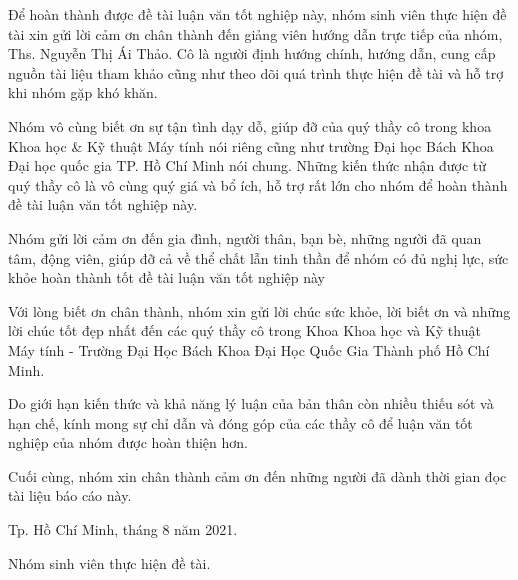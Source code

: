 Để hoàn thành được đề tài luận văn tốt nghiệp này, nhóm sinh viên thực hiện đề tài xin gửi lời cảm ơn chân thành đến giảng viên hướng dẫn trực tiếp của nhóm, Ths. Nguyễn Thị Ái Thảo. Cô là người định hướng chính, hướng dẫn, cung cấp nguồn tài liệu tham khảo cũng như theo dõi quá trình thực hiện đề tài và hỗ trợ khi nhóm gặp khó khăn.\par

Nhóm vô cùng biết ơn sự tận tình dạy dỗ, giúp đỡ của quý thầy cô trong khoa Khoa học \& Kỹ thuật Máy tính nói riêng cũng như trường Đại học Bách Khoa  Đại học quốc gia TP. Hồ Chí Minh nói chung. Những kiến thức nhận được từ quý thầy cô là vô cùng quý giá và bổ ích, hỗ trợ rất lớn cho nhóm để hoàn thành đề tài luận văn tốt nghiệp này.\par

Nhóm gửi lời cảm ơn đến gia đình, người thân, bạn bè, những người đã quan tâm, động viên, giúp đỡ cả về thể chất lẫn tinh thần để nhóm có đủ nghị lực, sức khỏe hoàn thành tốt đề tài luận văn tốt nghiệp này\par

Với lòng biết ơn chân thành, nhóm xin gửi lời chúc sức khỏe, lời biết ơn
và những lời chúc tốt đẹp nhất đến các quý thầy cô trong Khoa Khoa học và Kỹ thuật Máy tính - Trường Đại Học Bách Khoa Đại Học Quốc Gia Thành phố Hồ Chí Minh.\par

Do giới hạn kiến thức và khả năng lý luận của bản thân còn nhiều thiếu sót và hạn chế, kính mong sự chỉ dẫn và đóng góp của các thầy cô để luận văn tốt nghiệp của nhóm được hoàn thiện hơn.\par

Cuối cùng, nhóm xin chân thành cảm ơn đến những người đã dành thời gian đọc tài liệu báo cáo này.

\begin{flushright}
Tp. Hồ Chí Minh, tháng 8 năm 2021.\par

Nhóm sinh viên thực hiện đề tài.
\end{flushright}
